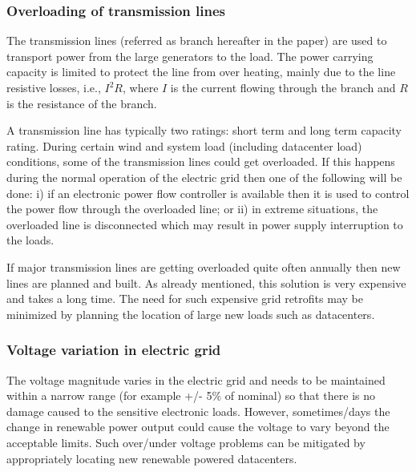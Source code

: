 \subsubsection{Overloading of transmission lines}
The transmission lines (referred as branch hereafter in the paper) are used to transport power from the large generators to the load. The power carrying capacity is limited to protect the line from over heating, mainly due to the line resistive losses, i.e., $I^{2}R$, where $I$ is the current flowing through the branch and $R$ is the resistance of the branch.

A transmission line has typically two ratings: short term and long term capacity rating. During certain wind and system load (including datacenter load) conditions, some of the transmission lines could get overloaded. If this happens during the normal operation of the electric grid then one of the following will be done: i) if an electronic power flow controller is available then it is used to control the power flow through the overloaded line; or ii) in extreme situations, the overloaded line is disconnected which may result in power supply interruption to the loads.

If major transmission lines are getting overloaded quite often annually then new lines are planned and built.  As already mentioned, this solution is very expensive and takes a long time. The need for such expensive grid retrofits may be minimized by planning the location of large new loads such as datacenters.

\subsubsection{Voltage variation in electric grid}
The voltage magnitude varies in the electric grid and needs to be maintained within a narrow range (for example +/- 5\% of nominal) so that there is no damage caused to the sensitive electronic loads. However, sometimes/days the change in renewable power output could cause the voltage to vary beyond the acceptable limits. Such over/under voltage problems can be mitigated by appropriately locating new renewable powered datacenters.

